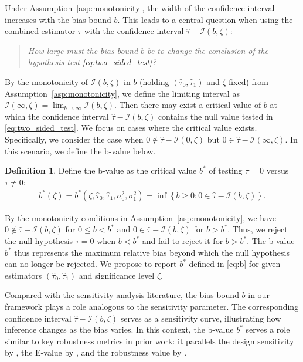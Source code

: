 \documentclass[11pt]{article}
\def\cI{{\mathcal I}}
\newcommand{\htau}{\widehat\tau}
\numberwithin{equation}{section}
\theoremstyle{definition}
\newtheorem{definition}{Definition}[section]
\begin{document}
Under Assumption~\ref{asp:monotonicity}, the width of the confidence interval increases with the bias bound $b$. This leads to a central question when using the combined estimator $\hat\tau$ with the confidence interval $\hat\tau - \cI(b, \zeta)$:
\begin{quote}
  \textit{How large must the bias bound $b$ be to change the conclusion of the hypothesis test \eqref{eq:two_sided_test}?}
\end{quote}

By the monotonicity of $\cI(b, \zeta)$ in $b$ (holding $(\htau_0, \htau_1)$ and $\zeta$ fixed) from Assumption~\ref{asp:monotonicity}, we define the limiting interval as $\cI(\infty, \zeta) = \lim_{b \to \infty} \cI(b, \zeta)$. Then there may exist a critical value of $b$ at which the confidence interval $\hat\tau - \cI(b, \zeta)$ contains the null value tested in \eqref{eq:two_sided_test}. We focus on cases where the critical value exists. Specifically, we consider the case when $0 \notin \hat\tau - \cI(0, \zeta)$ but $0 \in \hat\tau - \cI(\infty, \zeta)$. In this scenario, we define the b-value below.

\begin{definition}\label{def:b}
  Define the b-value as the critical value $b^*$ of testing $\tau = 0$ versus $\tau \neq 0$:
  \begin{align}\label{eq:b}
    b^*(\zeta) = b^*(\zeta, \htau_0, \htau_1, \sigma_0^2, \sigma_1^2) = \inf\left\{b \ge 0: 0 \in \hat\tau - \cI(b, \zeta)\right\}.
  \end{align}
\end{definition}


By the monotonicity conditions in Assumption~\ref{asp:monotonicity}, we have $0 \notin \hat\tau - \cI(b, \zeta)$ for $0 \le b < b^*$ and $0 \in \hat\tau - \cI(b, \zeta)$ for $b > b^*$. Thus, we reject the null hypothesis $\tau = 0$ when $b < b^*$ and fail to reject it for $b > b^*$. The b-value $b^*$ thus represents the maximum relative bias beyond which the null hypothesis can no longer be rejected. We propose to report $b^*$ defined in \eqref{eq:b} for given estimators $(\htau_0,\htau_1)$ and significance level $\zeta$. 

Compared with the sensitivity analysis literature, the bias bound $b$ in our framework plays a role analogous to the sensitivity parameter. The corresponding confidence interval $\hat\tau - \cI(b, \zeta)$ serves as a sensitivity curve, illustrating how inference changes as the bias varies. In this context, the b-value $b^*$ serves a role similar to key robustness metrics in prior work: it parallels
the design sensitivity by \cite{rosenbaum2004design}, the E-value by \cite{vanderweele2017sensitivity}, and the robustness value by \cite{cinelli2020making}.
\end{document}
